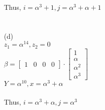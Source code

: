 \documentclass{article}
\begin{document}
Thus, $i = \alpha^3 + 1, j = \alpha^3 + \alpha + 1$\\\\\\
(d)\\
$z_1 = \alpha^{14}, z_2 = 0$\\
$\beta =\left[ \begin{array}{llll}{1} & {0} & {0} & {0}\end{array}\right] \cdot \left[ \begin{array}{c}{1} \\ {\alpha} \\ {\alpha^{2}} \\ {\alpha^{3}}\end{array}\right]$\\
$Y = \alpha^{10}, x = \alpha^3 + \alpha$\\\\
Thus, $i=\alpha^3 + \alpha, j = \alpha^3$
\end{document}
